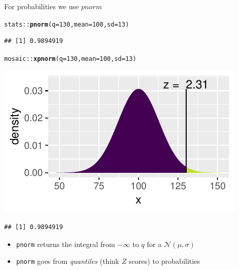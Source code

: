 \documentclass{beamer}\usepackage[]{graphicx}\usepackage[]{color}
\newcommand{\hlnum}[1]{\textcolor[rgb]{0.686,0.059,0.569}{#1}}%
\newcommand{\hlopt}[1]{\textcolor[rgb]{0,0,0}{#1}}%
\newcommand{\hlstd}[1]{\textcolor[rgb]{0.345,0.345,0.345}{#1}}%
\newcommand{\hlkwc}[1]{\textcolor[rgb]{0.333,0.667,0.333}{#1}}%
\newcommand{\hlkwd}[1]{\textcolor[rgb]{0.737,0.353,0.396}{\textbf{#1}}}%
\newenvironment{knitrout}{}{} %
\begin{document}
\begin{frame}[fragile]{For probabilities we use $pnorm$}


\begin{knitrout}\scriptsize
{}\color{fgcolor}
\begin{alltt}
\hlstd{stats}\hlopt{::}\hlkwd{pnorm}\hlstd{(}\hlkwc{q} \hlstd{=} \hlnum{130}\hlstd{,} \hlkwc{mean} \hlstd{=} \hlnum{100}\hlstd{,} \hlkwc{sd} \hlstd{=} \hlnum{13}\hlstd{)}
\end{alltt}
\begin{verbatim}
## [1] 0.9894919
\end{verbatim}

\end{knitrout}

\pause 

\begin{knitrout}\scriptsize
{}\color{fgcolor}
\begin{alltt}
\hlstd{mosaic}\hlopt{::}\hlkwd{xpnorm}\hlstd{(}\hlkwc{q} \hlstd{=} \hlnum{130}\hlstd{,} \hlkwc{mean} \hlstd{=} \hlnum{100}\hlstd{,} \hlkwc{sd} \hlstd{=} \hlnum{13}\hlstd{)}
\end{alltt}


{\centering \includegraphics[width=0.6\linewidth]{figure/probs3-1} 

}


\begin{verbatim}
## [1] 0.9894919
\end{verbatim}

\end{knitrout}

\pause 

\begin{itemize}
	\item \texttt{pnorm} returns the integral from $-\infty$ to $q$ for a $\mathcal{N}(\mu, \sigma)$
	\item \texttt{pnorm} goes from \textit{quantiles} (think $Z$ scores) to probabilities
\end{itemize}

\end{frame}
\end{document}
